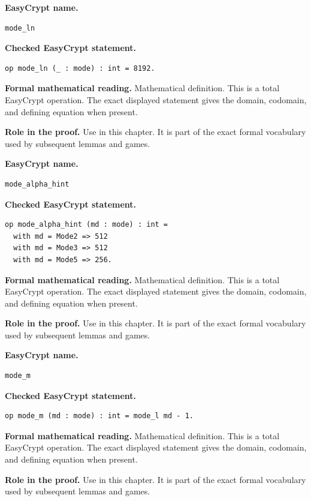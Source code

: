 \begin{formaldefinition}
\noindent\textbf{EasyCrypt name.}
\begin{lstlisting}[language=EasyCrypt,basicstyle=\ttfamily\scriptsize]
mode_ln
\end{lstlisting}
\noindent\textbf{Checked EasyCrypt statement.}
\begin{lstlisting}[language=EasyCrypt,basicstyle=\ttfamily\scriptsize]
op mode_ln (_ : mode) : int = 8192.
\end{lstlisting}
\noindent\textbf{Formal mathematical reading.}
Mathematical definition. This is a total EasyCrypt operation.  The exact displayed statement gives the domain, codomain, and defining equation when present.

\noindent\textbf{Role in the proof.}
Use in this chapter. It is part of the exact formal vocabulary used by subsequent lemmas and games.

\end{formaldefinition}

\begin{formaldefinition}
\noindent\textbf{EasyCrypt name.}
\begin{lstlisting}[language=EasyCrypt,basicstyle=\ttfamily\scriptsize]
mode_alpha_hint
\end{lstlisting}
\noindent\textbf{Checked EasyCrypt statement.}
\begin{lstlisting}[language=EasyCrypt,basicstyle=\ttfamily\scriptsize]
op mode_alpha_hint (md : mode) : int =
  with md = Mode2 => 512
  with md = Mode3 => 512
  with md = Mode5 => 256.
\end{lstlisting}
\noindent\textbf{Formal mathematical reading.}
Mathematical definition. This is a total EasyCrypt operation.  The exact displayed statement gives the domain, codomain, and defining equation when present.

\noindent\textbf{Role in the proof.}
Use in this chapter. It is part of the exact formal vocabulary used by subsequent lemmas and games.

\end{formaldefinition}

\begin{formaldefinition}
\noindent\textbf{EasyCrypt name.}
\begin{lstlisting}[language=EasyCrypt,basicstyle=\ttfamily\scriptsize]
mode_m
\end{lstlisting}
\noindent\textbf{Checked EasyCrypt statement.}
\begin{lstlisting}[language=EasyCrypt,basicstyle=\ttfamily\scriptsize]
op mode_m (md : mode) : int = mode_l md - 1.
\end{lstlisting}
\noindent\textbf{Formal mathematical reading.}
Mathematical definition. This is a total EasyCrypt operation.  The exact displayed statement gives the domain, codomain, and defining equation when present.

\noindent\textbf{Role in the proof.}
Use in this chapter. It is part of the exact formal vocabulary used by subsequent lemmas and games.

\end{formaldefinition}

